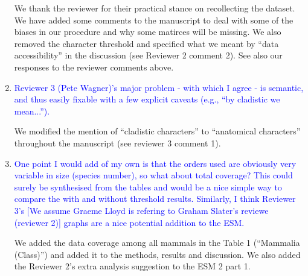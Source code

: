 \documentclass[12pt,letterpaper]{article}
\begin{document}
\begin{enumerate}
We thank the reviewer for their practical stance on recollecting the dataset. We have added some comments to the manuscript to deal with some of the biases in our procedure and why some matirces will be missing.
We also removed the character threshold and specified what we meant by ``data accessibility'' in the discussion (see Reviewer 2 comment 2). See also our responses to the reviewer comments above.

\item{\textcolor{blue}{Reviewer 3 (Pete Wagner)'s major problem - with which I agree - is semantic, and thus easily fixable with a few explicit caveats (e.g., ``by cladistic we mean...'').}}

We modified the mention of ``cladistic characters'' to ``anatomical characters'' throughout the manuscript (see reviewer 3 comment 1).

\item{\textcolor{blue}{One point I would add of my own is that the orders used are obviously very variable in size (species number), so what about total coverage?
This could surely be synthesised from the tables and would be a nice simple way to compare the with and without threshold results.
Similarly, I think Reviewer 3's [We assume Graeme Lloyd is refering to Graham Slater's reviewe (reviewer 2)] graphs are a nice potential addition to the ESM.}}

We added the data coverage among all mammals in the Table 1 (``Mammalia (Class)'') and added it to the methods, results and discussion.
We also added the Reviewer 2's extra analysis suggestion to the ESM 2 part 1.

\end{enumerate}
\end{document}
